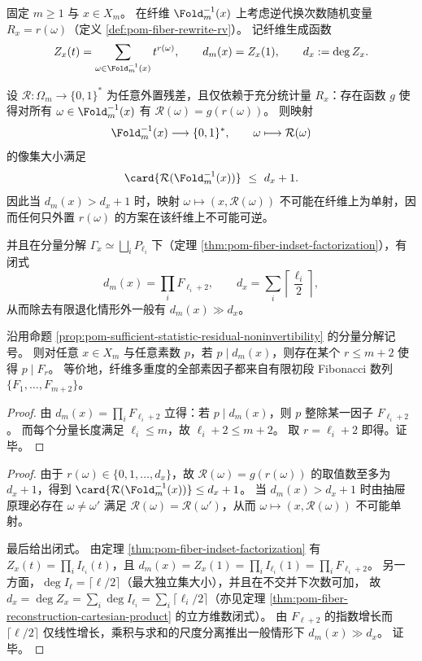 \begin{proposition}[充分统计量外置与可逆外置的结构性不相容]\label{prop:pom-sufficient-statistic-residual-noninvertibility}
固定 \(m\ge 1\) 与 \(x\in X_m\)。
在纤维 \(\Fold_m^{-1}(x)\) 上考虑逆代换次数随机变量 \(R_x=r(\omega)\)（定义 \ref{def:pom-fiber-rewrite-rv}）。
记纤维生成函数
\[
Z_x(t)=\sum_{\omega\in\Fold_m^{-1}(x)} t^{r(\omega)},
\qquad
d_m(x)=Z_x(1),
\qquad
d_x:=\deg Z_x.
\]
\par
设 \(\mathcal R:\Omega_m\to\{0,1\}^{\ast}\) 为任意外置残差，且仅依赖于充分统计量 \(R_x\)：存在函数 \(g\) 使得对所有 \(\omega\in\Fold_m^{-1}(x)\) 有
\(
\mathcal R(\omega)=g(r(\omega))
\)。
则映射
\[
\Fold_m^{-1}(x)\longrightarrow \{0,1\}^{\ast},
\qquad
\omega\longmapsto \mathcal R(\omega)
\]
的像集大小满足
\[
\card{\mathcal R(\Fold_m^{-1}(x))}\ \le\ d_x+1.
\]
因此当 \(d_m(x)>d_x+1\) 时，映射
\(
\omega\mapsto (x,\mathcal R(\omega))
\)
不可能在纤维上为单射，因而任何只外置 \(r(\omega)\) 的方案在该纤维上不可能可逆。
\par
并且在分量分解 \(\Gamma_x\simeq\bigsqcup_i P_{\ell_i}\) 下（定理 \ref{thm:pom-fiber-indset-factorization}），有闭式
\[
d_m(x)=\prod_i F_{\ell_i+2},
\qquad
d_x=\sum_i \left\lceil\frac{\ell_i}{2}\right\rceil,
\]
从而除去有限退化情形外一般有 \(d_m(x)\gg d_x\)。
\end{proposition}

\begin{corollary}\label{cor:pom-fiber-multiplicity-fibonacci-prime-closure}
沿用命题 \ref{prop:pom-sufficient-statistic-residual-noninvertibility} 的分量分解记号。
则对任意 \(x\in X_m\) 与任意素数 \(p\)，若 \(p\mid d_m(x)\)，则存在某个 \(r\le m+2\) 使得 \(p\mid F_r\)。
等价地，纤维多重度的全部素因子都来自有限初段 Fibonacci 数列 \(\{F_1,\dots,F_{m+2}\}\)。
\end{corollary}
\begin{proof}
由 \(d_m(x)=\prod_i F_{\ell_i+2}\) 立得：若 \(p\mid d_m(x)\)，则 \(p\) 整除某一因子 \(F_{\ell_i+2}\)。
而每个分量长度满足 \(\ell_i\le m\)，故 \(\ell_i+2\le m+2\)。
取 \(r=\ell_i+2\) 即得。证毕。
\end{proof}

\begin{proof}
由于 \(r(\omega)\in\{0,1,\dots,d_x\}\)，故 \(\mathcal R(\omega)=g(r(\omega))\) 的取值数至多为 \(d_x+1\)，得到 \(\card{\mathcal R(\Fold_m^{-1}(x))}\le d_x+1\)。
当 \(d_m(x)>d_x+1\) 时由抽屉原理必存在 \(\omega\neq\omega'\) 满足 \(\mathcal R(\omega)=\mathcal R(\omega')\)，从而 \(\omega\mapsto(x,\mathcal R(\omega))\) 不可能单射。
\par
最后给出闭式。
由定理 \ref{thm:pom-fiber-indset-factorization} 有 \(Z_x(t)=\prod_i I_{\ell_i}(t)\)，且 \(d_m(x)=Z_x(1)=\prod_i I_{\ell_i}(1)=\prod_i F_{\ell_i+2}\)。
另一方面，\(\deg I_{\ell}=\lceil \ell/2\rceil\)（最大独立集大小），并且在不交并下次数可加，
故 \(d_x=\deg Z_x=\sum_i \deg I_{\ell_i}=\sum_i \lceil \ell_i/2\rceil\)（亦见定理 \ref{thm:pom-fiber-reconstruction-cartesian-product} 的立方维数闭式）。
由 \(F_{\ell+2}\) 的指数增长而 \(\lceil \ell/2\rceil\) 仅线性增长，乘积与求和的尺度分离推出一般情形下 \(d_m(x)\gg d_x\)。
证毕。
\end{proof}

